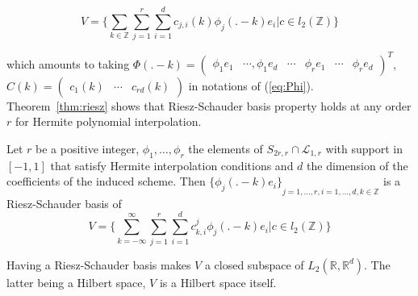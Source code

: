 \documentclass[a4paper, 11pt]{article}
\begin{document}
\begin{equation}
  V = \{ \sum_{k \in \mathbb{Z}} \sum_{j=1}^r \sum_{i=1}^d c_{j, i}(k) \phi_j(.-k)e_i | c \in l_2(\mathbb{Z}) \}
\end{equation}

which amounts to taking $\Phi(.-k) = \begin{pmatrix} \phi_1e_1 & \cdots, \phi_1 e_d & \cdots & \phi_r e_1 & \cdots & 
\phi_r e_d \end{pmatrix}^T$, $C(k) =  \begin{pmatrix} c_1(k) & \cdots & c_{rd}(k) \end{pmatrix}$ in notations of 
(\ref{eq:Phi}). Theorem~\ref{thm:riesz} shows that Riesz-Schauder basis property holds at any order $r$ for Hermite 
polynomial interpolation.

\begin{thm}{5}
  \label{thm:riesz}
  Let $r$ be a positive integer, $\phi_1, \ldots, \phi_r$ the elements of $S_{2r, r} \cap \mathcal{L}_{1,r}$ with 
  support in $[-1,1]$ that satisfy Hermite interpolation conditions and $d$ the dimension of the coefficients of the 
  induced scheme. Then  ${\{\phi_j(.-k)e_i \}}_{j=1, \ldots, r, i=1, \ldots, d, k \in \mathbb{Z}}$ is a Riesz-Schauder 
  basis of
  \begin{equation}
    V = \{ \sum_{k=-\infty}^{\infty} \sum_{j=1}^r \sum_{i=1}^d c^j_{k,i} \phi_j(.-k)e_i | c \in l_2(\mathbb{Z}) \}
  \end{equation}
\end{thm}

\begin{remark}{4}
  Having a Riesz-Schauder basis makes $V$ a closed subspace of $L_2(\mathbb{R}, \mathbb{R}^d)$. The latter being a 
  Hilbert space, $V$ is a Hilbert space itself.
\end{remark}
\end{document}
